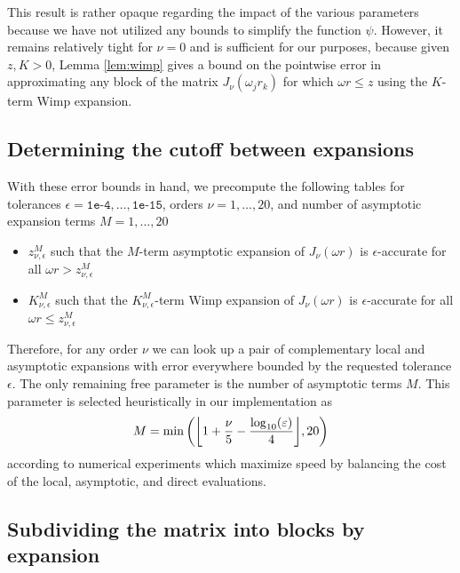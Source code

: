 This result is rather opaque regarding the impact of the various parameters
because we have not utilized any bounds to simplify the function $\psi$.
However, it remains relatively tight for $\nu = 0$ and is sufficient for our
purposes, because given $z, K > 0$, Lemma \ref{lem:wimp} gives a bound on the
pointwise error in approximating any block of the matrix $J_\nu(\omega_j r_k)$
for which $\omega r \leq z$ using the $K$-term Wimp expansion. 

\subsection{Determining the cutoff between expansions}

With these error bounds in hand, we precompute the following tables for
tolerances $\epsilon = \texttt{1e-4}, \dots, \texttt{1e-15}$, orders $\nu = 1,
\dots, 20$, and number of asymptotic expansion terms $M = 1, \dots, 20$
\begin{itemize}
    \item $z_{\nu, \epsilon}^M$ such that the $M$-term asymptotic expansion of
    $J_\nu(\omega r)$ is $\epsilon$-accurate for all $\omega r > z_{\nu,
    \epsilon}^M$
    \item $K_{\nu, \epsilon}^M$ such that the $K_{\nu, \epsilon}^M$-term Wimp
    expansion of $J_\nu(\omega r)$ is $\epsilon$-accurate for all $\omega r \leq
    z_{\nu, \epsilon}^M$
\end{itemize}
Therefore, for any order $\nu$ we can look up a pair of complementary local and
asymptotic expansions with error everywhere bounded by the requested tolerance
$\epsilon$. The only remaining free parameter is the number of asymptotic terms
$M$. This parameter is selected heuristically in our implementation as 
\begin{equation}
    M = \min\left({\left\lfloor 1 + \frac{\nu}{5} - \frac{\log_{10}(\varepsilon)}{4} \right\rfloor}, 20\right)
\end{equation}
according to numerical experiments which maximize speed by balancing the cost of
the local, asymptotic, and direct evaluations.

\subsection{Subdividing the matrix into blocks by expansion}

